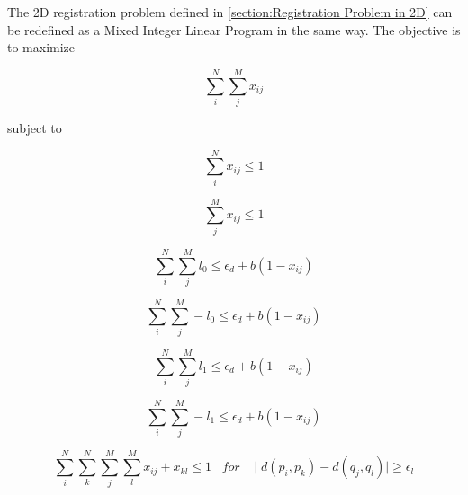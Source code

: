        The 2D registration problem defined in \autoref{section:Registration Problem in 2D} can be redefined as a Mixed Integer Linear Program in the same way.
        The objective is to maximize
        
        \begin{equation}
            \label{eq:objective_original}
            \sum_{i}^{N} \sum_{j}^{M} x_{ij}    
        \end{equation}
        
        subject to
        
        \begin{equation}
            \label{eq:subject_sum_rows}
            \sum_{i}^{N} x_{ij} \leq 1
        \end{equation}
        
        \begin{equation}
            \label{eq:subject_sum_columns}
            \sum_{j}^{M} x_{ij} \leq 1
        \end{equation}

        \begin{equation}
            \label{eq:subject_transformation_0}
            \sum_{i}^{N} \sum_{j}^{M} l_{0} \leq \epsilon_d + b (1 - x_{ij})
        \end{equation}

        \begin{equation}
            \label{eq:subject_transformation_negative_0}
            \sum_{i}^{N} \sum_{j}^{M} -l_{0} \leq \epsilon_d + b (1 - x_{ij})
        \end{equation}

        \begin{equation}
            \label{eq:subject_transformation_1}
            \sum_{i}^{N} \sum_{j}^{M} l_{1} \leq \epsilon_d + b (1 - x_{ij})
        \end{equation}

        \begin{equation}
            \label{eq:subject_transformation_negative_1}
            \sum_{i}^{N} \sum_{j}^{M} -l_{1} \leq \epsilon_d + b (1 - x_{ij})
        \end{equation}

        \begin{equation}
            \label{eq:subject_lines_preservation}
            \sum_{i}^{N} \sum_{k}^{N} \sum_{j}^{M} \sum_{l}^{M} x_{ij} + x_{kl} \leq 1 \;\;\; for \;\;\; \mid d(p_i, p_k) - d(q_j, q_l) \mid \geq \epsilon_l
        \end{equation}

